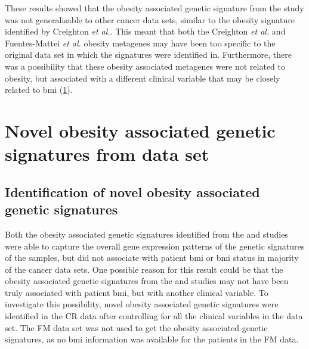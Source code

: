 These results showed that the obesity associated genetic signature from the \citet{Fuentes-Mattei2014} study was not generalisable to other cancer data sets, similar to the obesity signature identified by Creighton \textit{et al.}.
This meant that both the Creighton \textit{et al.} and Fuentes-Mattei \textit{et al.} obesity metagenes may have been too specific to the original data set in which the signatures were identified in.
Furthermore, there was a possibility that these obesity associated metagenes were not related to obesity, but associated with a different clinical variable that may be closely related to \gls{bmi} (\cref{sec:creighton_obesity_metagene_new}).

\section{Novel obesity associated genetic signatures from \citet{Creighton2012} data set}
\label{sec:creighton_obesity_metagene_new}

\subsection{Identification of novel obesity associated genetic signatures}
\label{sub:identification_of_obesity_associated_genetic_signatures}

Both the obesity associated genetic signatures identified from the \citet{Creighton2012} and \citet{Fuentes-Mattei2014} studies were able to capture the overall gene expression patterns  of the genetic signatures of the samples, but did not associate with patient \gls{bmi} or \gls{bmi} status in majority of the cancer data sets.
One possible reason for this result could be that the obesity associated genetic signatures from the \citet{Creighton2012} and \citet{Fuentes-Mattei2014} studies may not have been truly associated with patient \gls{bmi}, but with another clinical variable.
To investigate this possibility, novel obesity associated genetic signatures were identified in the CR data after controlling for all the clinical variables in the data set.
The FM data set was not used to get the obesity associated genetic signatures, as no \gls{bmi} information was available for the patients in the FM data.

